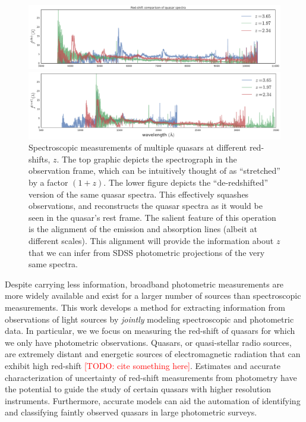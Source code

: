 \documentclass{article}
\newcommand{\red}[1]{\textcolor{red}{[TODO: #1]}}
\begin{document}
\begin{figure}[ht]
\vskip 0.2in
\begin{center}
\centerline{\includegraphics[width=2\columnwidth]{../figs/quasar_redshift_obs_frame}}
\centerline{\includegraphics[width=2\columnwidth]{../figs/quasar_redshift_rest_frame}}
\caption{Spectroscopic measurements of multiple quasars at different red-shifts, $z$.  The top graphic depicts the spectrograph in the observation frame, which can be intuitively thought of as ``stretched'' by a factor $(1+z)$.  The lower figure depicts the ``de-redshifted'' version of the same quasar spectra.  This effectively squashes observations, and reconstructs the quasar spectra as it would be seen in the quasar's rest frame.  The salient feature of this operation is the alignment of the emission and absorption lines (albeit at different scales).  This alignment will provide the information about $z$ that we can infer from SDSS photometric projections of the very same spectra.}
\label{fig:frames}
\end{center}
\vskip -0.2in
\end{figure} 

Despite carrying less information, broadband photometric measurements are more widely available and exist for a larger number of sources than spectroscopic measurements. 
This work develops a method for extracting information from observations of light sources by \emph{jointly} modeling spectroscopic and photometric data.  
In particular, we we focus on measuring the red-shift of quasars for which we only have photometric observations.  
Quasars, or quasi-stellar radio sources, are extremely distant and energetic sources of electromagnetic radiation that can exhibit high red-shift \red{cite something here}.  
Estimates and accurate characterization of uncertainty of red-shift measurements from photometry have the potential to guide the study of certain quasars with higher resolution instruments.  
Furthermore, accurate models can aid the automation of identifying and classifying faintly observed quasars in large photometric surveys.  
\end{document}
